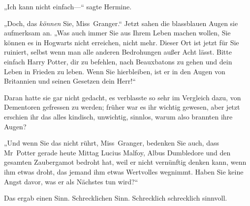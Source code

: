 „Ich kann nicht einfach—“ sagte Hermine.

„Doch, das \emph{können} Sie, Miss~Granger.“ Jetzt sahen die blassblauen Augen sie aufmerksam an. „Was auch immer Sie aus Ihrem Leben machen wollen, Sie können es in Hogwarts nicht erreichen, nicht mehr. Dieser Ort ist jetzt für Sie ruiniert, selbst wenn man alle anderen Bedrohungen außer Acht lässt. Bitte einfach Harry Potter, dir zu befehlen, nach Beauxbatons zu gehen und dein Leben in Frieden zu leben. Wenn Sie hierbleiben, ist er in den Augen von Britannien und seinen Gesetzen dein Herr!“

Daran hatte sie gar nicht gedacht, es verblasste so sehr im Vergleich dazu, von Dementoren gefressen zu werden; früher war es ihr wichtig gewesen, aber jetzt erschien ihr das alles kindisch, unwichtig, sinnlos, warum also brannten ihre Augen?

„Und wenn Sie das nicht rührt, Miss~Granger, bedenken Sie auch, dass Mr~Potter gerade heute Mittag Lucius Malfoy, Albus Dumbledore und den gesamten Zaubergamot bedroht hat, weil er nicht vernünftig denken kann, wenn ihm etwas droht, das jemand ihm etwas Wertvolles wegnimmt. Haben Sie keine Angst davor, was er als Nächstes tun wird?“

Das ergab einen Sinn. Schrecklichen Sinn. Schrecklich schrecklich sinnvoll.

